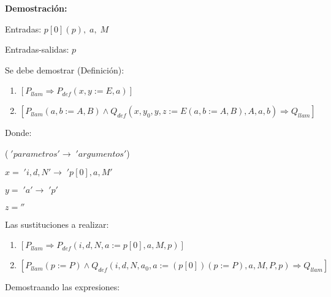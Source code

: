 \documentclass[hidelinks]{article}
\begin{document}
\textbf{Demostración:}

Entradas: $p[0](p), \; a, \; M$ \par
Entradas-salidas: $p$ \par

Se debe demostrar (Definición): \par
\begin{enumerate}
	\item $[P_{llam} \Rightarrow P_{def}(x,y := E,a)]$ \par
	\item $[P_{llam}(a,b := A,B) \land Q_{def}(x,y_0,y,z := E(a,b := A,B),A,a,b) \Rightarrow Q_{llam}]$ \par
\end{enumerate}

Donde: \par
($\;'parametros' \rightarrow \; 'argumentos'$) \par
$x= \;'i,d,N' \rightarrow \; 'p[0], a, M'$ \par
$y= \;'a' \rightarrow \; 'p'$ \par
$z=''$ \par

Las sustituciones a realizar: \par

\begin{enumerate}
	\item $[P_{llam} \Rightarrow P_{def}(i,d,N,a := p[0],a,M,p)]$ \par
	\item $[P_{llam}(p := P) \land Q_{def}(i,d,N,a_0,a := (p[0])(p := P),a, M, P, p) \Rightarrow Q_{llam}]$ \par
\end{enumerate}

Demostraando las expresiones: \par
\end{document}
